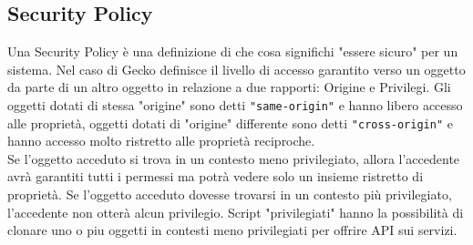 \documentclass{sapthesis}
\newcommand{\code}[1]{\texttt{#1}}
\begin{document}
        \subsection{Security Policy}
        \label{sec:sicurezza-script-security-policy}
            Una Security Policy è una definizione di che cosa significhi "essere sicuro" per un sistema.
            Nel caso di Gecko definisce il livello di accesso garantito verso un oggetto da parte di un
            altro oggetto in relazione a due rapporti: Origine e Privilegi.
            Gli oggetti dotati di stessa "origine" sono detti \code{"same-origin"} e hanno libero accesso
            alle proprietà, oggetti dotati di "origine" differente sono detti \code{"cross-origin"}
            e hanno accesso molto ristretto alle proprietà reciproche.\\
            Se l'oggetto acceduto si trova in un contesto meno privilegiato, allora l'accedente avrà
            garantiti tutti i permessi ma potrà vedere solo un insieme ristretto di proprietà.
            Se l'oggetto acceduto dovesse trovarsi in un contesto più privilegiato, l'accedente non otterà 
            alcun privilegio.
            Script "privilegiati" hanno la possibilità di clonare uno o piu oggetti in contesti
            meno privilegiati per offrire API sui servizi.
\end{document}

